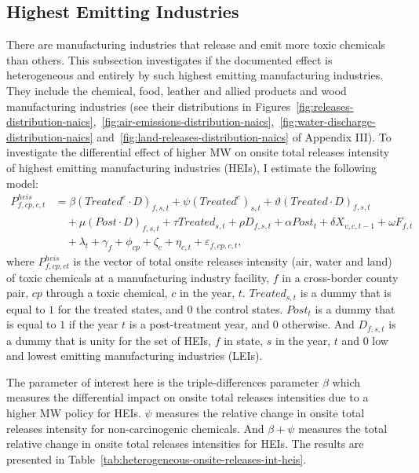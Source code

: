 \documentclass[12pt, english]{article}
\begin{document}
    \subsection{Highest Emitting Industries}\label{subsec:highest-emitting-industries}
    There are manufacturing industries that release and emit more toxic chemicals than others. This subsection investigates if the documented effect is heterogeneous and entirely by such highest emitting manufacturing industries. They include the chemical, food, leather and allied products and wood manufacturing industries (see their distributions in Figures~\ref{fig:releases-distribution-naics},~\ref{fig:air-emissions-distribution-naics},~\ref{fig:water-discharge-distribution-naics} and~\ref{fig:land-releases-distribution-naics} of Appendix III). To investigate the differential effect of higher MW on onsite total releases intensity of highest emitting manufacturing industries (HEIs), I estimate the following model:
    \begin{align}
        P_{f,cp,c,t}^{heis} &= \beta (Treated^{e} \cdot D)_{f,s,t} + \psi (Treated^{e})_{s,t} + \vartheta (Treated \cdot D)_{f,s,t} \nonumber \\
        &\quad + \mu (Post \cdot D)_{f,s,t} + \tau Treated_{s,t} + \rho D_{f,s,t} + \alpha Post_{t} + \delta X_{v,c,t-1} + \omega F_{f,t} \nonumber \\
        &\quad + \lambda_{t} + \gamma_{f} + \phi_{cp} + \zeta_{c} + \eta_{c,t} + \varepsilon_{f,cp,c,t},\label{eq:heterogeneous-onsite-releases-intensity-heis}
    \end{align}
    where $P_{f,cp,ct}^{heis}$ is the vector of total onsite releases intensity (air, water and land) of toxic chemicals at a manufacturing industry facility, $f$ in a cross-border county pair, $cp$ through a toxic chemical, $c$ in the year, $t$. $Treated_{s,t}$ is a dummy that is equal to $1$ for the treated states, and $0$ the control states. $Post_{t}$ is a dummy that is equal to $1$ if the year $t$ is a post-treatment year, and $0$ otherwise. And $D_{f,s,t}$ is a dummy that is unity for the set of HEIs, $f$ in state, $s$ in the year, $t$ and $0$ low and lowest emitting manufacturing industries (LEIs).
    

    The parameter of interest here is the triple-differences parameter $\beta$ which measures the differential impact on onsite total releases intensities due to a higher MW policy for HEIs. $\psi$ measures the relative change in onsite total releases intensity for non-carcinogenic chemicals. And $\beta + \psi$ measures the total relative change in onsite total releases intensities for HEIs. The results are presented in Table~\ref{tab:heterogeneous-onsite-releases-int-heis}.
    
\end{document}
